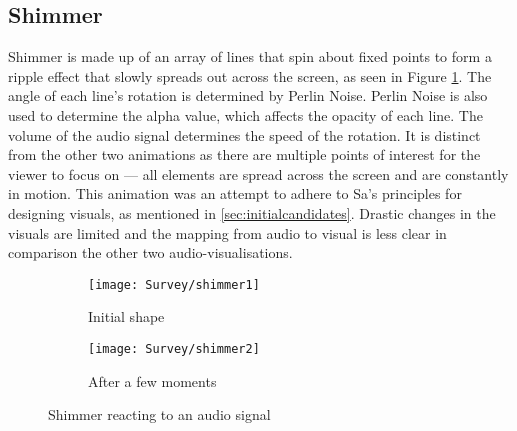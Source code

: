 \documentclass[../initial_thesis.tex]{subfiles}
\begin{document}
\subsection{Shimmer}
Shimmer is made up of an array of lines that spin about fixed points to form a ripple effect that slowly spreads out across the screen, as seen in Figure \ref{fig:shimmer1}. The angle of each line's rotation is determined by Perlin Noise. Perlin Noise is also used to determine the alpha value, which affects the opacity of each line. The volume of the audio signal determines the speed of the rotation. It is distinct from the other two animations as there are multiple points of interest for the viewer to focus on --- all elements are spread across the screen and are constantly in motion. This animation was an attempt to adhere to Sa's principles for designing visuals, as mentioned in \ref{sec:initialcandidates}. Drastic changes in the visuals are limited and the mapping from audio to visual is less clear in comparison the other two audio-visualisations.

\begin{figure}
  \begin{subfigure}{0.5\textwidth}
    \texttt{[image: Survey/shimmer1]}
    \caption{Initial shape}
  \end{subfigure} 
  \begin{subfigure}{0.5\textwidth}
    \texttt{[image: Survey/shimmer2]}
    \caption{After a few moments}
  \end{subfigure}
  \caption{Shimmer reacting to an audio signal}
  \label{fig:shimmer1}
\end{figure}
\end{document}
